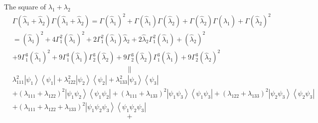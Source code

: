 \documentclass[aps,preprint]{revtex4}%
\begin{document}
The square of \quad$\lambda_{1}+\lambda_{2}$%
\begin{align}
& \Gamma\left(  \hat{\lambda}_{1}+\hat{\lambda}_{2}\right)  \Gamma\left(
\hat{\lambda}_{1}+\hat{\lambda}_{2}\right)  =\Gamma\left(  \hat{\lambda}%
_{1}\right)  ^{2}+\Gamma\left(  \hat{\lambda}_{1}\right)  \Gamma\left(
\hat{\lambda}_{2}\right)  +\Gamma\left(  \hat{\lambda}_{2}\right)
\Gamma\left(  \hat{\lambda}_{1}\right)  +\Gamma\left(  \hat{\lambda}%
_{2}\right)  ^{2}\nonumber\\
& =\left(  \hat{\lambda}_{1}\right)  ^{2}+4\Gamma_{1}^{2}\left(  \hat{\lambda
}_{1}\right)  ^{2}+2\Gamma_{1}^{2}\left(  \hat{\lambda}_{1}\right)
\hat{\lambda}_{2}+2\hat{\lambda}_{2}\Gamma_{1}^{2}\left(  \hat{\lambda}%
_{1}\right)  +\left(  \hat{\lambda}_{2}\right)  ^{2}\nonumber\\
& +9\Gamma_{1}^{3}\left(  \hat{\lambda}_{1}\right)  ^{2}+9\Gamma_{1}%
^{3}\left(  \hat{\lambda}_{1}\right)  \Gamma_{2}^{3}\left(  \hat{\lambda}%
_{2}\right)  +9\Gamma_{2}^{3}\left(  \hat{\lambda}_{2}\right)  \Gamma_{1}%
^{3}\left(  \hat{\lambda}_{1}\right)  +9\Gamma_{2}^{3}\left(  \hat{\lambda
}_{2}\right)  ^{2}%
\end{align}%
\[
\parallel
\]%
\begin{align}
& \lambda_{111}^{2}\left\vert \psi_{1}\right\rangle \left\langle \psi
_{1}\right\vert +\lambda_{122}^{2}\left\vert \psi_{2}\right\rangle
\left\langle \psi_{2}\right\vert +\lambda_{133}^{2}\left\vert \psi
_{3}\right\rangle \left\langle \psi_{3}\right\vert \nonumber\\
& +\left(  \lambda_{111}+\lambda_{122}\right)  ^{2}\left\vert \psi_{1}\psi
_{2}\right\rangle \left\langle \psi_{1}\psi_{2}\right\vert +\left(
\lambda_{111}+\lambda_{133}\right)  ^{2}\left\vert \psi_{1}\psi_{3}%
\right\rangle \left\langle \psi_{1}\psi_{3}\right\vert +\left(  \lambda
_{122}+\lambda_{133}\right)  ^{2}\left\vert \psi_{2}\psi_{3}\right\rangle
\left\langle \psi_{2}\psi_{3}\right\vert \nonumber\\
& +\left(  \lambda_{111}+\lambda_{122}+\lambda_{133}\right)  ^{2}\left\vert
\psi_{1}\psi_{2}\psi_{3}\right\rangle \left\langle \psi_{1}\psi_{2}\psi
_{3}\right\vert
\end{align}%
\[
+
\]%
\end{document}
